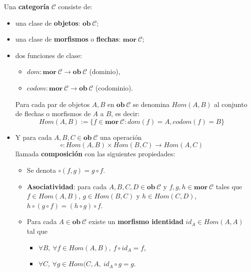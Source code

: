 \begin{definition}[Categoría]
Una \textbf{categoría} $\mathscr{C}$ consiste de:
\begin{itemize}[noitemsep,label=$\blacktriangleright$]
	\item una clase de \textbf{objetos}: $\mathbf{ob} \ \mathscr{C}$;
	\item una clase de \textbf{morfismos} o \textbf{flechas}: $\mathbf{mor} \ \mathscr{C}$;
	\item dos funciones de clase:
	\begin{itemize}[noitemsep,label=$\bullet$]
		\item $dom : \mathbf{mor} \ \mathscr{C} \rightarrow \mathbf{ob} \ \mathscr{C}$ (dominio),
		\item $codom : \mathbf{mor} \ \mathscr{C} \rightarrow \mathbf{ob} \ \mathscr{C}$ (codominio).
	\end{itemize}
	Para cada par de objetos $A, B$ en $\mathbf{ob} \ \mathscr{C}$ se denomina $Hom(A,B)$ al conjunto de flechas o morfismos de $A$ a $B$, es decir:
	\begin{equation*}
		Hom(A,B) := \{f \in \mathbf{mor} \ \mathscr{C} : dom(f) = A, codom(f) = B\}
	\end{equation*}
	\item Y para cada $A, B, C \in \mathbf{ob} \ \mathscr{C}$ una operación  
	\begin{equation*}
		\circ : Hom(A,B) \times Hom(B,C) \rightarrow Hom(A,C)
	\end{equation*}
	llamada \textbf{composición} con las siguientes propiedades: 
	\begin{itemize}[noitemsep,label=$\bullet$]
		\item Se denota $\circ(f,g) = g \circ f$.
		\item \textbf{Asociatividad}: para cada $A,B,C,D \in \mathbf{ob} \ \mathscr{C}$ y $f,g,h \in \mathbf{mor} \ \mathscr{C}$ tales que $f \in Hom(A,B)$, $g \in Hom(B,C)$ y $h \in Hom(C,D)$, \ \ $h \circ (g \circ f) = (h \circ g) \circ f$.
		\item Para cada $A \in \mathbf{ob} \ \mathscr{C}$ existe un \textbf{morfismo identidad} $id_A \in Hom(A,A)$ tal que
		\begin{itemize}[noitemsep,label=$\star$]
			\item $\forall B, \ \forall f \in Hom(A,B), \ f \circ id_A = f$,
			\item $\forall C, \ \forall g \in Hom(C,A, \ id_A \circ g = g$.
		\end{itemize}
	\end{itemize}
	
\end{itemize}
\end{definition}

